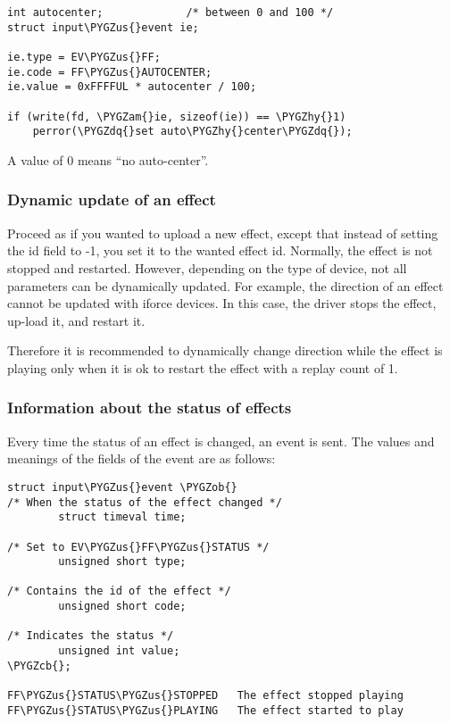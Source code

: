 \documentclass[a4paper,8pt,english]{sphinxmanual}
\def\PYGZus{\char`\_}
\def\PYGZob{\char`\{}
\def\PYGZcb{\char`\}}
\def\PYGZam{\char`\&}
\def\PYGZhy{\char`\-}
\def\PYGZdq{\char`\"}
\begin{document}
\begin{Verbatim}[commandchars=\\\{\}]
int autocenter;             /* between 0 and 100 */
struct input\PYGZus{}event ie;

ie.type = EV\PYGZus{}FF;
ie.code = FF\PYGZus{}AUTOCENTER;
ie.value = 0xFFFFUL * autocenter / 100;

if (write(fd, \PYGZam{}ie, sizeof(ie)) == \PYGZhy{}1)
    perror(\PYGZdq{}set auto\PYGZhy{}center\PYGZdq{});
\end{Verbatim}

A value of 0 means ``no auto-center''.


\subsubsection{Dynamic update of an effect}
\label{input/ff:dynamic-update-of-an-effect}
Proceed as if you wanted to upload a new effect, except that instead of
setting the id field to -1, you set it to the wanted effect id.
Normally, the effect is not stopped and restarted. However, depending on the
type of device, not all parameters can be dynamically updated. For example,
the direction of an effect cannot be updated with iforce devices. In this
case, the driver stops the effect, up-load it, and restart it.

Therefore it is recommended to dynamically change direction while the effect
is playing only when it is ok to restart the effect with a replay count of 1.


\subsubsection{Information about the status of effects}
\label{input/ff:information-about-the-status-of-effects}
Every time the status of an effect is changed, an event is sent. The values
and meanings of the fields of the event are as follows:

\begin{Verbatim}[commandchars=\\\{\}]
struct input\PYGZus{}event \PYGZob{}
/* When the status of the effect changed */
        struct timeval time;

/* Set to EV\PYGZus{}FF\PYGZus{}STATUS */
        unsigned short type;

/* Contains the id of the effect */
        unsigned short code;

/* Indicates the status */
        unsigned int value;
\PYGZcb{};

FF\PYGZus{}STATUS\PYGZus{}STOPPED   The effect stopped playing
FF\PYGZus{}STATUS\PYGZus{}PLAYING   The effect started to play
\end{Verbatim}
\end{document}

